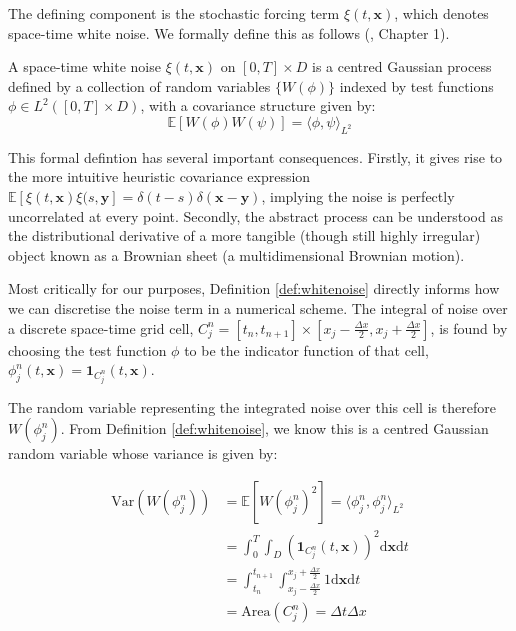 The defining component is the stochastic forcing term $\xi(t,\mathbf{x})$, which denotes 
space-time white noise. We formally define this as follows (\cite{walsh2006introduction}, Chapter 1).

\begin{definition}
\label{def:whitenoise}
A space-time white noise $\xi(t,\mathbf{x})$ on $[0,T] \times D$ is a centred
Gaussian process defined by a collection of random variables 
$\{W(\phi)\}$ indexed by test functions $\phi \in L^2([0,T] \times D)$, 
with a covariance structure given by:
\[
\mathbb{E}[W(\phi)W(\psi)] = \langle \phi, \psi \rangle_{L^2}
\]
\end{definition}

This formal defintion has several important consequences. Firstly, it gives rise 
to the more intuitive heuristic covariance expression 
$\mathbb{E}\left[\xi(t,\mathbf{x})\xi(s,\mathbf{y}\right] = 
\delta(t-s)\delta(\mathbf{x}-\mathbf{y})$, implying the noise is perfectly uncorrelated 
at every point. Secondly, the abstract process can be understood as the distributional
derivative of a more tangible (though still highly irregular) object
known as a Brownian sheet (a multidimensional Brownian motion).

Most critically for our purposes, Definition \ref{def:whitenoise} directly informs 
how we can discretise the noise term in a numerical scheme. The integral of 
noise over a discrete space-time grid cell, $C_j^n = [t_n, t_{n+1}] \times
[x_j - \frac{\Delta x}{2}, x_j + \frac{\Delta x}{2}]$, is found by choosing the test
function $\phi$ to be the indicator function of that cell, $\phi_j^n(t, \mathbf{x}) 
= \mathbf{1}_{C_j^n}(t, \mathbf{x})$. 

The random variable representing the integrated noise over this cell is therefore 
$W(\phi_j^n)$. From Definition \ref{def:whitenoise}, we know this is a centred Gaussian 
random variable whose variance is given by:

\begin{subequations}\label{eq:white_noise_integral_derivation}
    \begin{align*}
        \mathrm{Var}(W(\phi_j^n)) &= \mathbb{E}[W(\phi_j^n)^2] = 
        \langle \phi_j^n, \phi_j^n \rangle_{L^2} \\
        &= \int_0^T \int_D (\mathbf{1}_{C_j^n}(t, \mathbf{x}))^2 
        \mathrm{d}\mathbf{x} \mathrm{d}t \\
        &= \int_{t_n}^{t_{n+1}} \int_{x_j-\frac{\Delta x}{2}}^{x_j+\frac{\Delta x}{2}} 1
        \mathrm{d}\mathbf{x}\mathrm{d}t \\
        &= \text{Area}(C_j^n) = \Delta t \Delta x
    \end{align*}
\end{subequations}

